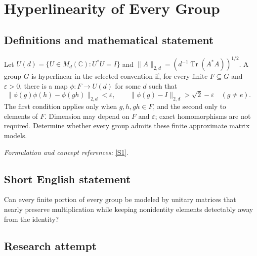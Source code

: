 \documentclass[11pt,a4paper]{article}
\newcommand{\C}{\mathbb{C}}
\newcommand{\eps}{\varepsilon}
\newcommand{\sref}[2]{\hyperlink{source:#1:#2}{[S#2]}}
\newif\ifshowcatalogue
\newcommand{\cataloguescope}[1]{\ifshowcatalogue
 \paragraph{Exact scope in the supplied catalogue.}
 \begin{quote}\small #1\end{quote}\fi}
\numberwithin{equation}{section}
\begin{document}
\setcounter{section}{0}
\clearpage
\section*{\texorpdfstring{Hyperlinearity of Every Group}{Hyperlinearity of Every Group}}\label{30006756}
\subsection{Definitions and mathematical statement}
Let $U(d)=\{U\in M_d(\C):U^*U=I\}$ and
$\|A\|_{2,d}=(d^{-1}\operatorname{Tr}(A^*A))^{1/2}$. A group $G$ is hyperlinear in the selected convention if, for every finite $F\subseteq G$ and $\eps>0$, there is a map $\phi:F\to U(d)$ for some $d$ such that
\[
 \|\phi(g)\phi(h)-\phi(gh)\|_{2,d}<\eps,
 \qquad \|\phi(g)-I\|_{2,d}>\sqrt2-\eps\quad(g\ne e).
\]
The first condition applies only when $g,h,gh\in F$, and the second only to elements of $F$. Dimension may depend on $F$ and $\eps$; exact homomorphisms are not required. Determine whether every group admits these finite approximate matrix models.
\par\smallskip\textit{Formulation and concept references:} \sref{30006756}{1}.
\cataloguescope{Determine whether every group G is hyperlinear. Precisely, for each finite F contained in G and each epsilon>0, must there be d>=1 and phi:F->U(d) such that ||phi(g)phi(h)-phi(gh)||\_(2,d)<epsilon whenever g,h,gh belong to F, and ||phi(g)-I||\_(2,d)>sqrt(2)-epsilon for every nonidentity g in F? Here ||X||\_(2,d)=(Tr(X*X)/d)\textasciicircum{}(1/2) is the normalized Hilbert-Schmidt norm. A negative resolution is a group failing this condition.}
\subsection{Short English statement}
Can every finite portion of every group be modeled by unitary matrices that nearly preserve multiplication while keeping nonidentity elements detectably away from the identity?
\subsection{Research attempt}
\end{document}
